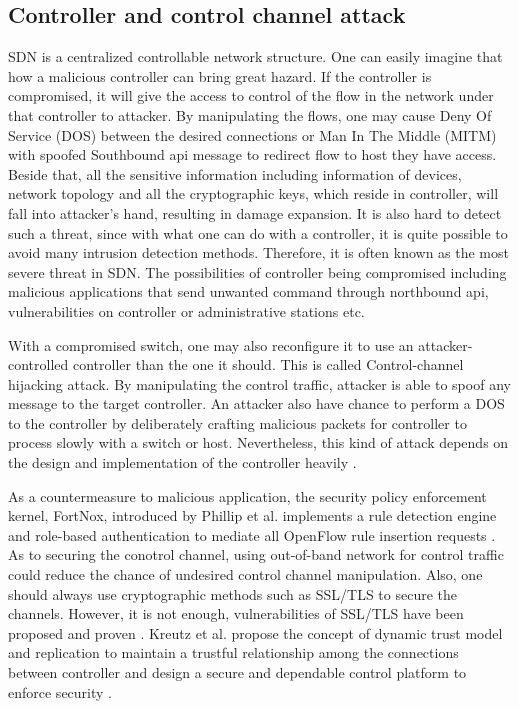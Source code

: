 \subsection{Controller and control channel attack}
SDN is a centralized controllable network structure. One can easily imagine that how a malicious controller can bring great hazard. If the controller is compromised, it will give the access to control of the flow in the network under that controller to attacker. By manipulating the flows, one may cause Deny Of Service (DOS) between the desired connections or Man In The Middle (MITM) with spoofed Southbound api message to redirect flow to host they have access. Beside that, all the sensitive information including information of devices, network topology and all the cryptographic keys, which reside in controller, will fall into attacker's hand, resulting in damage expansion. It is also hard to detect such a threat, since with what one can do with a controller, it is quite possible to avoid many intrusion detection methods. Therefore, it is often known as the most severe threat in SDN. The possibilities of controller being compromised including malicious applications that send unwanted command through northbound api, vulnerabilities on controller or administrative stations etc.

With a compromised switch, one may also reconfigure it to use an attacker-controlled controller than the one it should. This is called Control-channel hijacking attack. By manipulating the control traffic, attacker is able to spoof any message to the target controller. An attacker also have chance to perform a DOS to the controller by deliberately crafting malicious packets for controller to process slowly with a switch or host. Nevertheless, this kind of attack depends on the design and implementation of the controller heavily \cite{AAS14}.

As a countermeasure to malicious application, the security policy enforcement kernel, FortNox, introduced by Phillip et al. implements a rule detection engine and role-based authentication to mediate all OpenFlow rule insertion requests \cite{PSYFTG12}. As to securing the conotrol channel, using out-of-band network for control traffic could reduce the chance of undesired control channel manipulation. Also, one should always use cryptographic methods such as SSL/TLS to secure the channels. However, it is not enough, vulnerabilities of SSL/TLS have been proposed and proven \cite{HRKC12}. Kreutz et al. propose the concept of dynamic trust model and replication to maintain a trustful relationship among the connections between controller and design a secure and dependable control platform to enforce security \cite{KDFRV13}. 

